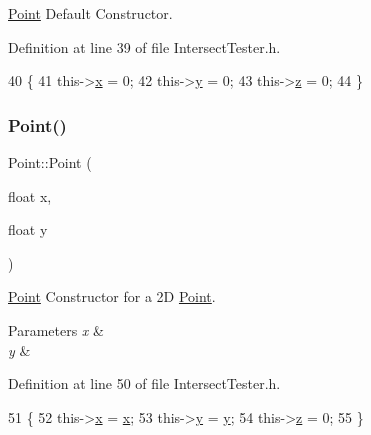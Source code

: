 \hyperlink{class_point}{Point} Default Constructor. 



Definition at line 39 of file Intersect\+Tester.\+h.


\begin{DoxyCode}
40         \{
41             this->\hyperlink{class_point_a05dfe2dfbde813ad234b514f30e662f1}{x} = 0;
42             this->\hyperlink{class_point_a6101960c8d2d4e8ea1d32c9234bbeb8d}{y} = 0;
43             this->\hyperlink{class_point_a9a666531e0e99adff132be93d2407d0c}{z} = 0;
44         \}
\end{DoxyCode}
\mbox{\label{class_point_a30bc8409287de4f43e160664be834636}} 
\subsubsection{\texorpdfstring{Point()}{Point()}\hspace{0.1cm}{\footnotesize\ttfamily [2/3]}}
{\footnotesize\ttfamily Point\+::\+Point (\begin{DoxyParamCaption}\item[{float}]{x,  }\item[{float}]{y }\end{DoxyParamCaption})\hspace{0.3cm}{\ttfamily [inline]}}



\hyperlink{class_point}{Point} Constructor for a 2D \hyperlink{class_point}{Point}. 


\begin{DoxyParams}{Parameters}
{\em x} & \\
\hline
{\em y} & \\
\hline
\end{DoxyParams}


Definition at line 50 of file Intersect\+Tester.\+h.


\begin{DoxyCode}
51         \{
52             this->\hyperlink{class_point_a05dfe2dfbde813ad234b514f30e662f1}{x} = \hyperlink{class_point_a05dfe2dfbde813ad234b514f30e662f1}{x};
53             this->\hyperlink{class_point_a6101960c8d2d4e8ea1d32c9234bbeb8d}{y} = \hyperlink{class_point_a6101960c8d2d4e8ea1d32c9234bbeb8d}{y};
54             this->\hyperlink{class_point_a9a666531e0e99adff132be93d2407d0c}{z} = 0;
55         \}
\end{DoxyCode}
\mbox{\label{class_point_a405838cb39b8fb6119633d9ba7e6b4fb}} 
